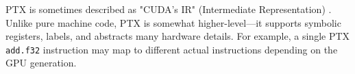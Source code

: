 PTX is sometimes described as "CUDA's IR" (Intermediate Representation) \citep{bruce_lee_tensor_core}. Unlike pure machine code, PTX is somewhat higher-level—it supports symbolic registers, labels, and abstracts many hardware details. For example, a single PTX \texttt{add.f32} instruction may map to different actual instructions depending on the GPU generation.

